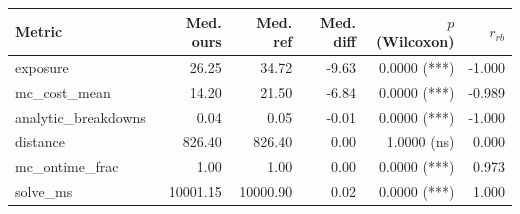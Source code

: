 \begin{tabular}{lrrrrr}
\toprule
Metric & Med. ours & Med. ref & Med. diff & $p$ (Wilcoxon) & $r_{rb}$ \\
\midrule
exposure & 26.25 & 34.72 & -9.63 & 0.0000 (***) & -1.000 \\
mc_cost_mean & 14.20 & 21.50 & -6.84 & 0.0000 (***) & -0.989 \\
analytic_breakdowns & 0.04 & 0.05 & -0.01 & 0.0000 (***) & -1.000 \\
distance & 826.40 & 826.40 & 0.00 & 1.0000 (ns) & 0.000 \\
mc_ontime_frac & 1.00 & 1.00 & 0.00 & 0.0000 (***) & 0.973 \\
solve_ms & 10001.15 & 10000.90 & 0.02 & 0.0000 (***) & 1.000 \\
\bottomrule
\end{tabular}
